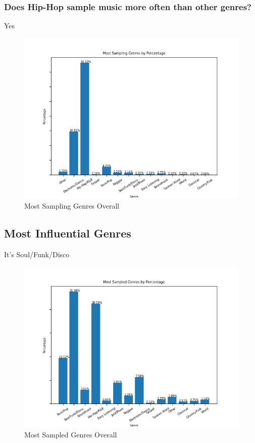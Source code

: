 \documentclass[pageno]{jpaper}
\begin{document}
\subsubsection{Does Hip-Hop sample music more often than other genres?}
Yes
\begin{figure}[H]
\includegraphics{topSamplingGenresPercent}
\caption{Most Sampling Genres Overall}
\centering
\end{figure}
\subsection{Most Influential Genres}
It's Soul/Funk/Disco
\begin{figure}[H]
\includegraphics{topSampledGenresPercent}
\caption{Most Sampled Genres Overall}
\centering
\end{figure}
\end{document}
